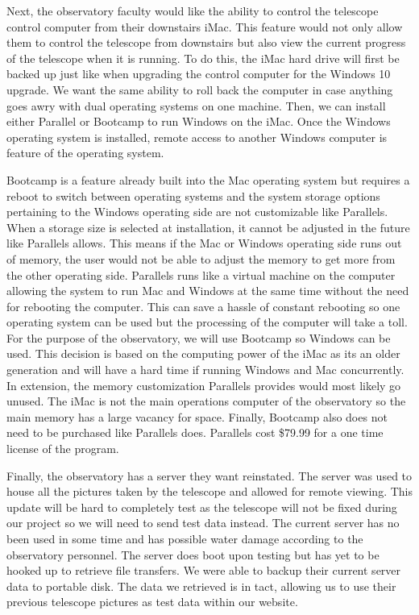 \documentclass[12pt]{report}
\begin{document}
Next, the observatory faculty would like the ability to control the telescope control computer from their downstairs iMac. This feature would not only allow them to control the telescope from downstairs but also view the current progress of the telescope when it is running. To do this, the iMac hard drive will first be backed up just like when upgrading the control computer for the Windows 10 upgrade. We want the same ability to roll back the computer in case anything goes awry with dual operating systems on one machine. Then, we can install either Parallel or Bootcamp to run Windows on the iMac. Once the Windows operating system is installed, remote access to another Windows computer is feature of the operating system.

Bootcamp is a feature already built into the Mac operating system but requires a reboot to switch between operating systems and the system storage options pertaining to the Windows operating side are not customizable like Parallels. When a storage size is selected at installation, it cannot be adjusted in the future like Parallels allows. This means if the Mac or Windows operating side runs out of memory, the user would not be able to adjust the memory to get more from the other operating side. Parallels runs like a virtual machine on the computer allowing the system to run Mac and Windows at the same time without the need for rebooting the computer. This can save a hassle of constant rebooting so one operating system can be used but the processing of the computer will take a toll. For the purpose of the observatory, we will use Bootcamp so Windows can be used. This decision is based on the computing power of the iMac as its an older generation and will have a hard time if running Windows and Mac concurrently. In extension, the memory customization Parallels provides would most likely go unused. The iMac is not the main operations computer of the observatory so the main memory has a large vacancy for space. Finally, Bootcamp also does not need to be purchased like Parallels does. Parallels cost \$79.99 for a one time license of the program.

Finally, the observatory has a server they want reinstated. The server was used to house all the pictures taken by the telescope and allowed for remote viewing. This update will be hard to completely test as the telescope will not be fixed during our project so we will need to send test data instead. The current server has no been used in some time and has possible water damage according to the observatory personnel. The server does boot upon testing but has yet to be hooked up to retrieve file transfers. We were able to backup their current server data to portable disk. The data we retrieved is in tact, allowing us to use their previous telescope pictures as test data within our website.
\end{document}
